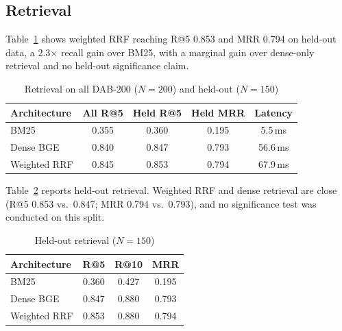 \documentclass[conference]{IEEEtran}
\begin{document}
\subsection{Retrieval}
Table~\ref{tab:retrieval} shows weighted RRF reaching R@5 0.853 and MRR 0.794 on held-out data, a 2.3$\times$ recall gain over BM25, with a marginal gain over dense-only retrieval and no held-out significance claim.
\begin{table}[t]
\caption{Retrieval on all DAB-200 ($N=200$) and held-out ($N=150$)}
\label{tab:retrieval}
\centering\scriptsize\setlength{\tabcolsep}{2.5pt}
\begin{tabular*}{\columnwidth}{@{\extracolsep{\fill}}lcccc@{}}
\toprule
Architecture & All R@5 & Held R@5 & Held MRR & Latency \\
\midrule
BM25 & 0.355 & 0.360 & 0.195 & 5.5\,ms \\
Dense BGE & 0.840 & 0.847 & 0.793 & 56.6\,ms \\
Weighted RRF & 0.845 & 0.853 & 0.794 & 67.9\,ms \\
\bottomrule
\end{tabular*}
\end{table}

Table~\ref{tab:retrheld} reports held-out retrieval. Weighted RRF and dense retrieval are close (R@5 0.853 vs.\ 0.847; MRR 0.794 vs.\ 0.793), and no significance test was conducted on this split.
\begin{table}[t]
\caption{Held-out retrieval ($N=150$)}
\label{tab:retrheld}
\centering\scriptsize\setlength{\tabcolsep}{3pt}
\begin{tabular*}{\columnwidth}{@{\extracolsep{\fill}}lccc@{}}
\toprule
Architecture & R@5 & R@10 & MRR \\
\midrule
BM25 & 0.360 & 0.427 & 0.195 \\
Dense BGE & 0.847 & 0.880 & 0.793 \\
Weighted RRF & 0.853 & 0.880 & 0.794 \\
\bottomrule
\end{tabular*}
\end{table}
\end{document}
